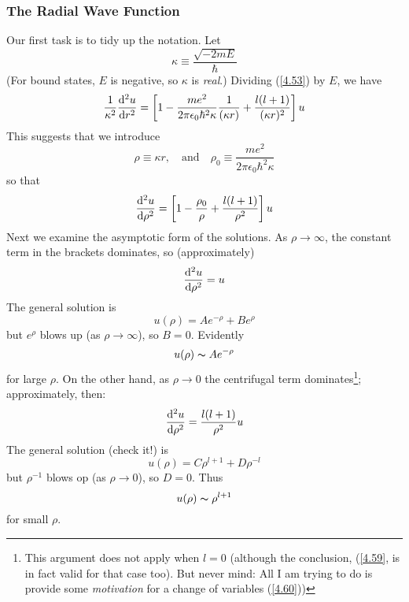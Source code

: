 \subsubsection{The Radial Wave Function}
Our first task is to tidy up the notation. Let
\begin{equation}\label{4.54}
	\kappa\equiv\frac{\sqrt{-2mE}}{\hbar}
\end{equation}
(For bound states, $E$ is negative, so $\kappa$ is \textit{real}.) Dividing (\ref{4.53}) by $E$, we have $$\frac{1}{\kappa^2}\dv[2]{u}{r}=\left[1-\frac{me^2}{2\pi\epsilon_0\hbar^2\kappa}\frac{1}{(\kappa r)}+\frac{l(l+1)}{(\kappa r)^2}\right]u$$ This suggests that we introduce
\begin{equation}\label{4.55}
	\rho\equiv\kappa r,\quad \mbox{and}\quad \rho_0\equiv\frac{me^2}{2\pi\epsilon_0\hbar^2\kappa}
\end{equation}
so that
\begin{equation}\label{4.56}
	\dv[2]{u}{\rho}=\left[1-\frac{\rho_0}{\rho}+\frac{l(l+1)}{\rho^2}\right]u
\end{equation}
Next we examine the asymptotic form of the solutions. As $\rho\to \infty$, the constant term in the brackets dominates, so (approximately) $$\dv[2]{u}{\rho}=u$$ The general solution is
\begin{equation}\label{4.57}
	u(\rho)=Ae^{-\rho}+Be^{\rho}
\end{equation}
but $e^{\rho}$ blows up (as $\rho\to\infty$), so $B=0$. Evidently
\begin{equation}\label{4.58}
	u(\rho)\thicksim Ae^{-\rho}
\end{equation}
for large $\rho$. On the other hand, as $\rho\to 0$ the centrifugal term dominates\footnote{This argument does not apply when $l=0$ (although the conclusion, (\ref{4.59}, is in fact valid for that case too). But never mind: All I am trying to do is provide some \textit{motivation} for a change of variables (\ref{4.60}))}; approximately, then: $$\dv[2]{u}{\rho}=\frac{l(l+1)}{\rho^2}u$$ The general solution (check it!) is $$u(\rho)=C\rho^{l+1}+D\rho^{-l}$$ but $\rho^{-1}$ blows op (as $\rho\to 0$), so $D=0$. Thus
\begin{equation}\label{4.59}
	u(\rho)\thicksim \rho^{l+1}
\end{equation}
for small $\rho$.

